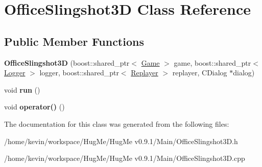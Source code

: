 \hypertarget{classOfficeSlingshot3D}{
\section{OfficeSlingshot3D Class Reference}
\label{classOfficeSlingshot3D}
}
\subsection*{Public Member Functions}
\begin{DoxyCompactItemize}
\item 
\hypertarget{classOfficeSlingshot3D_a3695f1459a3979777d0f06fdcbdde7a1}{
{\bfseries OfficeSlingshot3D} (boost::shared\_\-ptr$<$ \hyperlink{classGame}{Game} $>$ game, boost::shared\_\-ptr$<$ \hyperlink{classLogger}{Logger} $>$ logger, boost::shared\_\-ptr$<$ \hyperlink{classReplayer}{Replayer} $>$ replayer, CDialog $\ast$dialog)}
\label{classOfficeSlingshot3D_a3695f1459a3979777d0f06fdcbdde7a1}

\item 
\hypertarget{classOfficeSlingshot3D_a0f34ade76b08ebb126176bca57eaec66}{
void {\bfseries run} ()}
\label{classOfficeSlingshot3D_a0f34ade76b08ebb126176bca57eaec66}

\item 
\hypertarget{classOfficeSlingshot3D_a525fe6fecb5ec28394dfe906596a5421}{
void {\bfseries operator()} ()}
\label{classOfficeSlingshot3D_a525fe6fecb5ec28394dfe906596a5421}

\end{DoxyCompactItemize}


The documentation for this class was generated from the following files:\begin{DoxyCompactItemize}
\item 
/home/kevin/workspace/HugMe/HugMe v0.9.1/Main/OfficeSlingshot3D.h\item 
/home/kevin/workspace/HugMe/HugMe v0.9.1/Main/OfficeSlingshot3D.cpp\end{DoxyCompactItemize}
